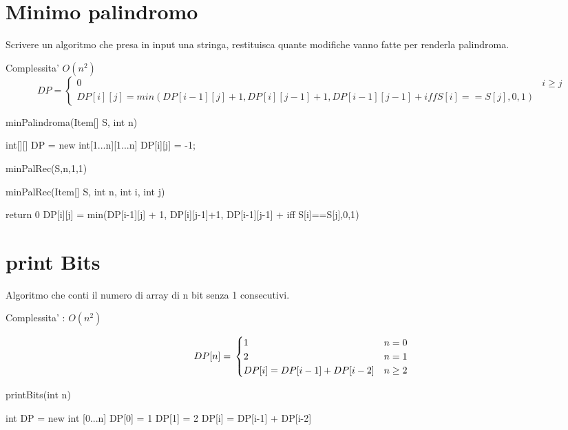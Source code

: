 \documentclass[oneside]{book}
\begin{document}
\section{Minimo palindromo}

Scrivere un algoritmo che presa in input una stringa, restituisca quante modifiche vanno fatte per renderla palindroma.

Complessita' $O(n^2)$
\begin{equation}
DP = 
	\begin{cases}
	0 & i \geq j \\
	DP[i][j] = min(DP[i-1][j] + 1, DP[i][j-1]+1, DP[i-1][j-1] + iff{S[i]==S[j],0,1})
	\end{cases}
\end{equation}

\begin{algorithm}
\caption{minPalindroma(Item[] S, int n)\label{alg:cap}}
\begin{algorithmic}
\State int[][] DP = new int[1...n][1...n]
		\State DP[i][j] = -1;
	\EndFor
\EndFor

\State minPalRec(S,n,1,1)
\end{algorithmic}
\end{algorithm}

\begin{algorithm}
\caption{minPalRec(Item[] S, int n, int i, int j)\label{alg:cap}}
\begin{algorithmic}
	return 0
\EndIf
{}
	\State DP[i][j] = min(DP[i-1][j] + 1, DP[i][j-1]+1, DP[i-1][j-1] + iff {S[i]==S[j],0,1})
\EndIf
\end{algorithmic}
\end{algorithm}
\section{print Bits}
Algoritmo che conti il numero di array di n bit senza 1 consecutivi.

Complessita' : $O(n^2)$

\begin{equation}
	DP[n] = \\
	\begin{cases}
	1 & n=0 \\
	2 & n=1 \\
	DP[i] = DP[i-1] + DP[i-2] & n \geq 2
	\end{cases}
\end{equation}

\begin{algorithm}
\caption{printBits(int n)\label{alg:cap}}
\begin{algorithmic}
	\State int DP = new int [0...n]
	\State DP[0] = 1
	\State DP[1] = 2
		\State DP[i] = DP[i-1] + DP[i-2]
	\EndFor
\end{algorithmic}
\end{algorithm}
\end{document}
